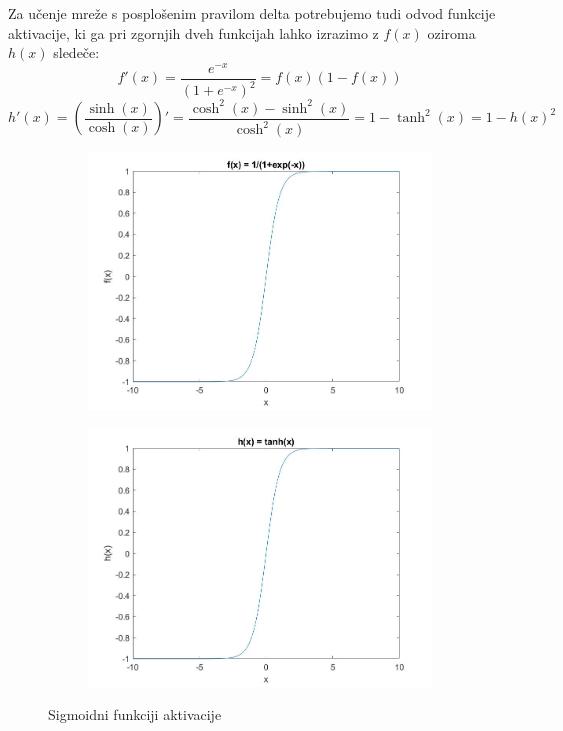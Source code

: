 \documentclass[mat1]{fmfdelo}
\begin{document}
Za učenje mreže s posplošenim pravilom delta potrebujemo tudi odvod funkcije aktivacije, ki ga pri zgornjih dveh funkcijah lahko izrazimo z $f(x)$ oziroma $h(x)$ sledeče:
%
\begin{equation}
f'(x) = \frac{e^{-x}}{(1+e^{-x})^2} = f(x)(1-f(x))
\end{equation}
%
\begin{equation}
h'(x) = \left(\frac{\sinh(x)}{\cosh(x)}\right)' = \frac{\cosh^2(x)- \sinh^2(x)}{\cosh^2(x)} = 1 - \tanh^2(x) = 1 - h(x)^2 
\end{equation}
%
\begin{figure}[!th]
\centering
\begin{subfigure}{.5\textwidth}
  \centering
  \includegraphics[width=.9\linewidth]{sig_exp.jpg}
\end{subfigure}%
\begin{subfigure}{.5\textwidth}
  \centering
  \includegraphics[width=.9\linewidth]{sig_tan.jpg}
\end{subfigure}
\caption{Sigmoidni funkciji aktivacije}
\label{fig:sigmoid}
\end{figure}
%
%
\end{document}
